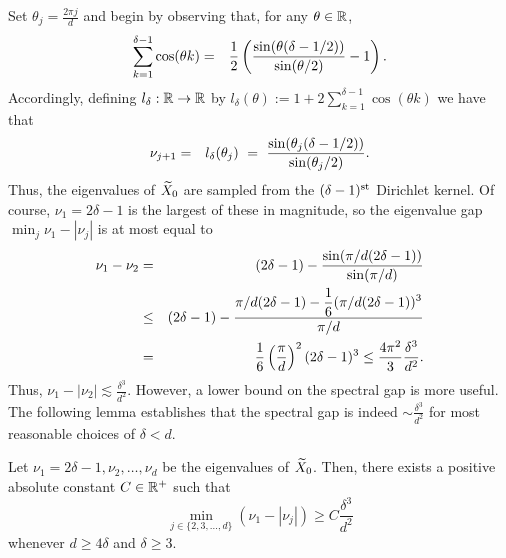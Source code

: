 Set $\theta_j = \frac{2 \pi j}{d}$ and begin by observing that, for any $\theta \in \mathbb{R}$,
\begin{eqnarray*}
  \sum_{k = 1}^{\delta - 1}\cos(\theta k) %
  & = & \bigfrac{1}{2}\left(\bigfrac{\sin(\theta(\delta - 1/2))}{\sin(\theta / 2)} - 1\right).
\end{eqnarray*}
Accordingly, defining $l_\delta : \mathbb{R} \to \mathbb{R}$ by $l_\delta(\theta) := 1 + 2\sum_{k=1}^{\delta - 1} \cos(\theta k)$ we have that
\begin{eqnarray}
  \nu_{j+1} %
  & = & l_\delta(\theta_j) ~=~ \bigfrac{\sin(\theta_j(\delta - 1/2))}{\sin(\theta_j / 2)}. \label{equ:EigenFormula}
\end{eqnarray}
Thus, the eigenvalues of $\widetilde{X}_0$ are sampled from the $(\delta-1)^{\rm st}$ Dirichlet kernel.  
Of course, $\nu_1 = 2\delta - 1$ is the largest of these in magnitude, so the eigenvalue gap $\min_j \nu_1 - |\nu_j|$ is at most equal to
\begin{eqnarray*}
  \nu_1 - \nu_2 & = & (2\delta -  1) - \frac{\displaystyle \sin(\pi / d (2\delta - 1))}{\displaystyle \sin(\pi / d)} \\
  & \le & (2 \delta - 1) - \frac{\displaystyle \pi / d(2 \delta - 1) - \frac{1}{6}(\pi / d (2 \delta - 1))^3}{\displaystyle \pi / d} \\
  & = & \frac{1}{6}\left(\frac{\pi}{d}\right)^2(2 \delta - 1)^3 \le \frac{4\pi^2}{3} \frac{\delta^3}{d^2} \label{equ:gap12}.
\end{eqnarray*}
Thus, $\nu_1 - |\nu_2 | \lesssim \frac{\delta^3}{d^2}$.  However, a lower bound on the spectral gap is more useful.  The following lemma establishes that the spectral gap is indeed $\sim \frac{\delta^3}{d^2}$ for most reasonable choices of $\delta < d$.

\begin{lem}
Let $\nu_1 = 2 \delta -1, \nu_2, \dots, \nu_d$ be the eigenvalues of $\widetilde{X}_0$.  Then, there exists a positive absolute constant $C \in \mathbb{R}^+$ such that
$$\min_{j \in \{2, 3, \dots, d \} } (\nu_1 - |\nu_j| ) \geq C \frac{\delta^3}{d^2}$$
whenever $d \geq 4\delta$ and $\delta \geq 3$. %
\label{lem:EigGap}
\end{lem}

